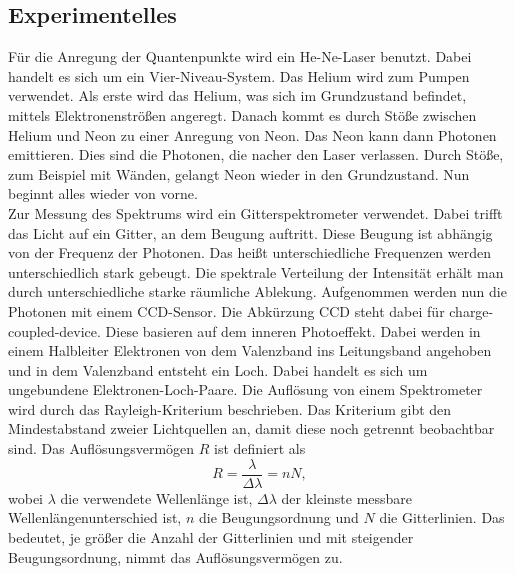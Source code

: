 \subsection{Experimentelles}
Für die Anregung der Quantenpunkte wird ein He-Ne-Laser benutzt. Dabei handelt es sich um ein Vier-Niveau-System. 
Das Helium wird zum Pumpen verwendet. 
Als erste wird das Helium, was sich im Grundzustand befindet, mittels Elektronenströßen angeregt. 
Danach kommt es durch Stöße zwischen Helium und Neon zu einer Anregung von Neon. 
Das Neon kann dann Photonen emittieren. 
Dies sind die Photonen, die nacher den Laser verlassen. 
Durch Stöße, zum Beispiel mit Wänden, gelangt Neon wieder in den Grundzustand. 
Nun beginnt alles wieder von vorne. \\
Zur Messung des Spektrums wird ein Gitterspektrometer verwendet. Dabei trifft das Licht auf ein Gitter, an dem Beugung auftritt. Diese Beugung ist abhängig von der Frequenz der Photonen. 
Das heißt unterschiedliche Frequenzen werden unterschiedlich stark gebeugt. 
Die spektrale Verteilung der Intensität erhält man durch unterschiedliche starke räumliche Ablekung.
Aufgenommen werden nun die Photonen mit einem CCD-Sensor. 
Die Abkürzung CCD steht dabei für charge-coupled-device. 
Diese basieren auf dem inneren Photoeffekt. 
Dabei werden in einem Halbleiter Elektronen von dem Valenzband ins Leitungsband angehoben und in dem Valenzband entsteht ein Loch. 
Dabei handelt es sich um ungebundene Elektronen-Loch-Paare. 
Die Auflösung von einem Spektrometer wird durch das Rayleigh-Kriterium beschrieben. 
Das Kriterium gibt den Mindestabstand zweier Lichtquellen an, damit diese noch getrennt beobachtbar sind. Das Auflösungsvermögen $R$ ist definiert als 
\begin{equation}
R = \frac{\lambda}{\Delta \lambda} = n N,
\label{eq:Auflösung}
\end{equation}
wobei $\lambda$ die verwendete Wellenlänge ist, $\Delta \lambda$ der kleinste messbare Wellenlängenunterschied ist, $n$ die Beugungsordnung und $N$ die Gitterlinien. 
Das bedeutet, je größer die Anzahl der Gitterlinien und mit steigender Beugungsordnung, nimmt das Auflösungsvermögen zu. 









